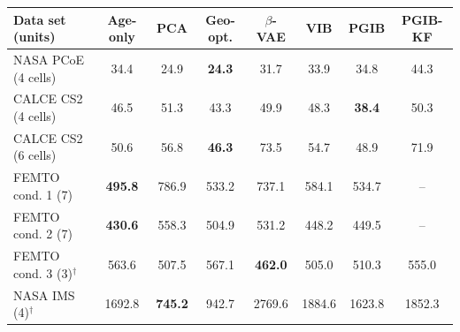 \begin{tabular}{l c c c c c c c }
\hline
Data set (units) & Age-only & PCA & Geo-opt. & $\beta$-VAE & VIB & PGIB & PGIB-KF \\
\hline
NASA PCoE (4 cells) & 34.4 & 24.9 & \textbf{24.3} & 31.7 & 33.9 & 34.8 & 44.3 \\
CALCE CS2 (4 cells) & 46.5 & 51.3 & 43.3 & 49.9 & 48.3 & \textbf{38.4} & 50.3 \\
CALCE CS2 (6 cells) & 50.6 & 56.8 & \textbf{46.3} & 73.5 & 54.7 & 48.9 & 71.9 \\
FEMTO cond. 1 (7) & \textbf{495.8} & 786.9 & 533.2 & 737.1 & 584.1 & 534.7 & -- \\
FEMTO cond. 2 (7) & \textbf{430.6} & 558.3 & 504.9 & 531.2 & 448.2 & 449.5 & -- \\
FEMTO cond. 3 (3)$^\dagger$ & 563.6 & 507.5 & 567.1 & \textbf{462.0} & 505.0 & 510.3 & 555.0 \\
NASA IMS (4)$^\dagger$ & 1692.8 & \textbf{745.2} & 942.7 & 2769.6 & 1884.6 & 1623.8 & 1852.3 \\
\hline
\end{tabular}
